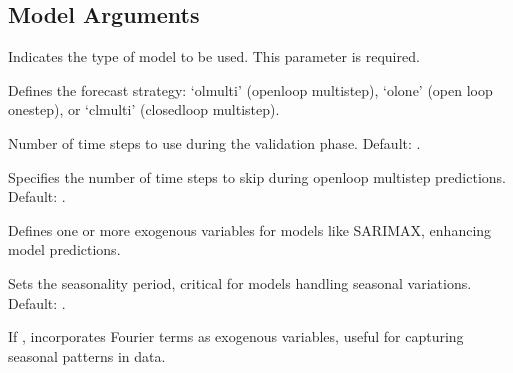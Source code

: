 \documentclass[letterpaper,10pt,english]{sphinxmanual}
\begin{document}
\subsection{Model Arguments}
\label{\detokenize{docs/parser_arguments:model-arguments}}\begin{description}
\sphinxAtStartPar
Indicates the type of model to be used. This parameter is required.

\sphinxAtStartPar
Defines the forecast strategy: ‘ol\sphinxhyphen{}multi’ (open\sphinxhyphen{}loop multi\sphinxhyphen{}step), ‘ol\sphinxhyphen{}one’ (open loop one\sphinxhyphen{}step), or ‘cl\sphinxhyphen{}multi’ (closed\sphinxhyphen{}loop multi\sphinxhyphen{}step).

\sphinxAtStartPar
Number of time steps to use during the validation phase. Default: .

\sphinxAtStartPar
Specifies the number of time steps to skip during open\sphinxhyphen{}loop multi\sphinxhyphen{}step predictions. Default: .

\sphinxAtStartPar
Defines one or more exogenous variables for models like SARIMAX, enhancing model predictions.

\sphinxAtStartPar
Sets the seasonality period, critical for models handling seasonal variations. Default: .

\sphinxAtStartPar
If , incorporates Fourier terms as exogenous variables, useful for capturing seasonal patterns in data.

\end{description}
\end{document}
